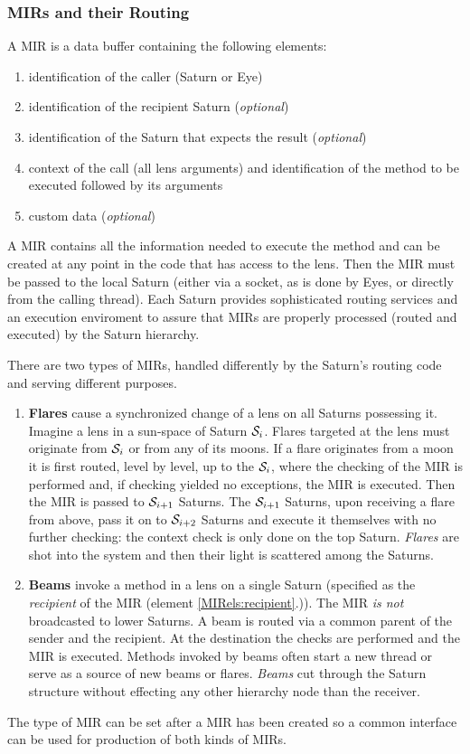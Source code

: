 \documentclass[a4paper,11pt]{article}
\begin{document}
\subsubsection{MIRs and their Routing}

A MIR is a data buffer containing the following elements:
\begin{enumerate}
\item identification of the caller (Saturn or Eye)
\item identification of the recipient Saturn (\emph{optional})
  \label{MIRels:recipient}
\item identification of the Saturn that expects the result
  (\emph{optional})
  \label{MIRels:result_recipient}
\item context of the call (all lens arguments) and identification of
  the method to be executed followed by its arguments
\item custom data (\emph{optional})
\end{enumerate}
A MIR contains all the information needed to execute the method and
can be created at any point in the code that has access to the lens.
Then the MIR must be passed to the local Saturn (either via a socket,
as is done by Eyes, or directly from the calling thread). Each Saturn
provides sophisticated routing services and an execution enviroment to
assure that MIRs are properly processed (routed and executed) by the
Saturn hierarchy.

There are two types of MIRs, handled differently by the Saturn's
routing code and serving different purposes.
\begin{enumerate}
\item \textbf{Flares} %
  cause a synchronized change of a lens on all Saturns
  possessing it.  Imagine a lens in a sun-space of Saturn ${\cal
    S}_i$. Flares targeted at the lens must originate from ${\cal
    S}_i$ or from any of its moons. If a flare originates from a moon
  it is first routed, level by level, up to the ${\cal S}_i$, where
  the checking of the MIR is performed and, if checking yielded no
  exceptions, the MIR is executed.  Then the MIR is passed to ${\cal
    S}_{i+1}$ Saturns. The ${\cal S}_{i+1}$ Saturns, upon receiving a
  flare from above, pass it on to ${\cal S}_{i+2}$ Saturns and execute
  it themselves with no further checking: the context check is only
  done on the top Saturn.  \emph{Flares} are shot into the system and
  then their light is scattered among the Saturns.

\item \textbf{Beams} %
  invoke a method in a lens on a single Saturn (specified as the
  \emph{recipient} of the MIR (element \ref{MIRels:recipient}.)). The
  MIR \emph{is not} broadcasted to lower Saturns. A beam is routed via
  a common parent of the sender and the recipient. At the destination
  the checks are performed and the MIR is executed.  Methods invoked
  by beams often start a new thread or serve as a source of new beams
  or flares.  \emph{Beams} cut through the Saturn structure without
  effecting any other hierarchy node than the receiver.
\end{enumerate}
The type of MIR can be set after a MIR has been created so a common
interface can be used for production of both kinds of MIRs.
\end{document}
